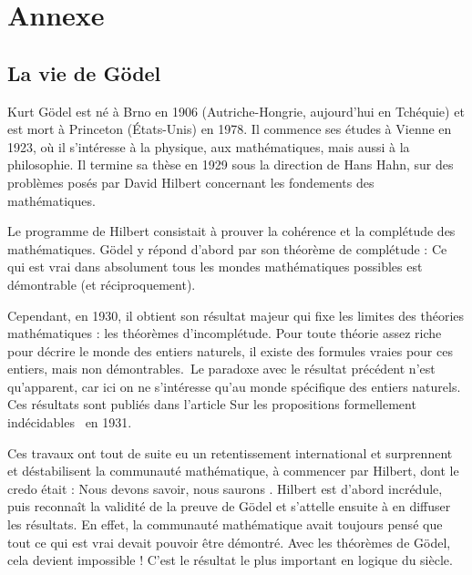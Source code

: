 \documentclass[11pt,class=report,crop=false]{standalone}
\begin{document}
\setcounter{section}{0}

\chapter*{Annexe}


\section*{La vie de Gödel}

Kurt Gödel est né à Brno en 1906 (Autriche-Hongrie, aujourd'hui en Tchéquie) et est mort à Princeton (États-Unis) en 1978. Il commence ses études à Vienne en 1923, où il s'intéresse à la physique, aux mathématiques, mais aussi à la philosophie. Il termine sa thèse en 1929 sous la direction de Hans Hahn, sur des problèmes posés par David Hilbert concernant les fondements des mathématiques.
\medskip

Le programme de Hilbert consistait à prouver la cohérence et la complétude des mathématiques. Gödel y répond d'abord par son théorème de complétude : \og Ce qui est vrai dans absolument tous les mondes mathématiques possibles est démontrable (et réciproquement).\fg
\medskip

Cependant, en 1930, il obtient son résultat majeur qui fixe les limites des théories mathématiques : les théorèmes d'incomplétude. \og Pour toute théorie assez riche pour décrire le monde des entiers naturels, il existe des formules vraies pour ces entiers, mais non démontrables.\fg\ Le paradoxe avec le résultat précédent n'est qu'apparent, car ici on ne s'intéresse qu'au monde spécifique des entiers naturels. Ces résultats sont publiés dans l'article \og Sur les propositions formellement indécidables \fg\ en 1931. 
\medskip

Ces travaux ont tout de suite eu un retentissement international et surprennent et déstabilisent la communauté mathématique, à commencer par Hilbert, dont le credo était : \og Nous devons savoir, nous saurons \fg. Hilbert est d'abord incrédule, puis reconnaît la validité de la preuve de Gödel et s'attelle ensuite à en diffuser les résultats. En effet, la communauté mathématique avait toujours pensé que tout ce qui est vrai devait pouvoir être démontré. Avec les théorèmes de Gödel, cela devient impossible ! C'est le résultat le plus important en logique du siècle.
\medskip
\end{document}
